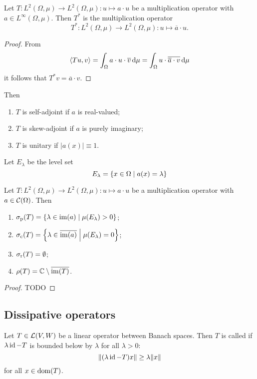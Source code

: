 \begin{lemma}
Let $T: L^2(\Omega, \mu) \to L^2(\Omega, \mu): u \mapsto a\cdot u$ be a multiplication operator with $a\in L^\infty(\Omega,\mu)$. Then $T^*$ is the multiplication operator
\[ T^*: L^2(\Omega, \mu) \to L^2(\Omega, \mu): u \mapsto \overline{a}\cdot u. \]
\end{lemma}
\begin{proof}
From 
\[ \left\langle Tu,v \right\rangle = \int_\Omega a\cdot u \cdot \overline{v}\operatorname{d \!}{\mu} = \int_\Omega u \cdot \overline{\overline{a}\cdot v}\operatorname{d \!}{\mu} \]
it follows that $T^*v = \overline{a}\cdot v$.
\end{proof}
\begin{corollary}
Then
\begin{enumerate}
\item $T$ is self-adjoint if $a$ is real-valued;
\item $T$ is skew-adjoint if $a$ is purely imaginary;
\item $T$ is unitary if $|a(x)| \equiv 1$.
\end{enumerate}
\end{corollary}

Let $E_\lambda$ be the level set
\[ E_\lambda = \left\{ x\in\Omega \;\middle|\; a(x) = \lambda \right\} \]

\begin{proposition}
Let $T: L^2(\Omega, \mu) \to L^2(\Omega, \mu): u\mapsto a\cdot u$ be a multiplication operator with $a\in \operatorname{\mathcal{C}}(\Omega)$. Then
\begin{enumerate}
\item $\sigma_\text{p}(T) = \left\{ \lambda\in \operatorname{im}(a) \;\middle|\; \mu(E_\lambda)>0 \right\}$;
\item $\sigma_\text{c}(T) = \left\{ \lambda\in \overline{\operatorname{im}(a)} \;\middle|\; \mu(E_\lambda) = 0 \right\}$;
\item $\sigma_\text{r}(T) = \emptyset$;
\item $\rho(T) = \mathbb{C}\setminus \overline{\operatorname{im}(T)}$.
\end{enumerate}
\end{proposition}
\begin{proof}
TODO
\end{proof}

\subsection{Dissipative operators}
\begin{definition}
Let $T\in \operatorname{\mathcal{L}}(V, W)$ be a linear operator between Banach spaces. Then $T$ is called  if $\lambda\operatorname{id}-T$ is bounded below by $\lambda$ for all $\lambda>0$:
\[ \lVert(\lambda\operatorname{id}-T)x\rVert \geq \lambda\lVert x\rVert \]
for all $x\in\operatorname{dom}(T)$.
\end{definition}

